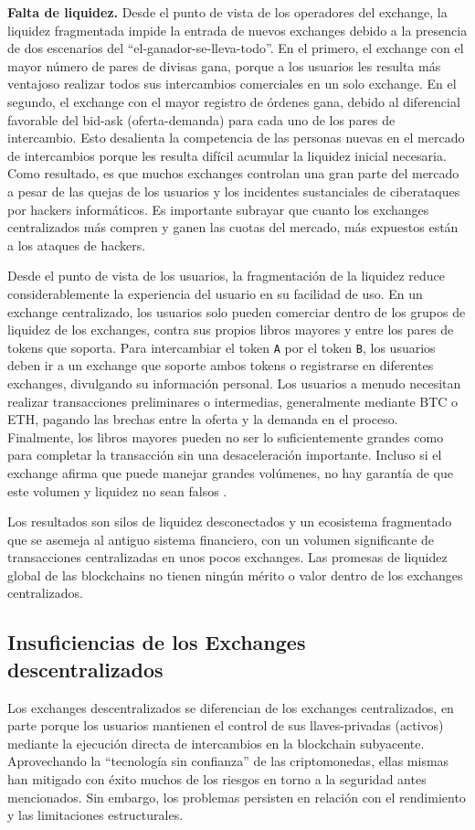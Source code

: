 \documentclass[UTF8,nofonts]{article}
\begin{document}
\begin{multicols}{2}
\textbf{Falta de liquidez.} Desde el punto de vista de los operadores del exchange, la liquidez fragmentada impide la entrada de nuevos exchanges debido a la presencia de dos escenarios del \enquote{el-ganador-se-lleva-todo}. En el primero, el exchange con el mayor n\'umero de pares de divisas gana, porque a los usuarios les resulta m\'as ventajoso realizar todos sus intercambios comerciales en un solo exchange. En el segundo, el exchange con el mayor registro de \'ordenes gana, debido al diferencial favorable del bid-ask (oferta-demanda) para cada uno de los pares de intercambio. Esto desalienta la competencia de las personas nuevas en el mercado de intercambios porque les resulta dif\'icil acumular la liquidez inicial necesaria. Como resultado, es que muchos exchanges controlan una gran parte del mercado a pesar de las quejas de los usuarios y los incidentes sustanciales de ciberataques por hackers inform\'aticos. Es importante subrayar que cuanto los exchanges centralizados m\'as compren y ganen las cuotas del mercado, m\'as expuestos est\'an a los ataques de hackers.

Desde el punto de vista de los usuarios, la fragmentaci\'on de la liquidez reduce considerablemente la experiencia del usuario en su facilidad de uso. En un exchange centralizado, los usuarios solo pueden comerciar dentro de los grupos de liquidez de los exchanges, contra sus propios libros mayores y entre los pares de tokens que soporta. Para intercambiar el token \verb|A| por el token \verb|B|, los usuarios deben ir a un exchange que soporte ambos tokens o registrarse en diferentes exchanges, divulgando su informaci\'on personal. Los usuarios a menudo necesitan realizar transacciones preliminares o intermedias, generalmente mediante BTC o ETH, pagando las brechas entre la oferta y la demanda en el proceso. Finalmente, los libros mayores pueden no ser lo suficientemente grandes como para completar la transacci\'on sin una desaceleraci\'on importante. Incluso si el exchange afirma que puede manejar grandes vol\'umenes, no hay garant\'ia de que este volumen y liquidez no sean falsos \cite{fakevolume}.

Los resultados son silos de liquidez desconectados y un ecosistema fragmentado que se asemeja al antiguo sistema financiero, con un volumen significante de transacciones centralizadas en unos pocos exchanges. Las promesas de liquidez global de las blockchains no tienen ning\'un m\'erito o valor dentro de los exchanges centralizados.

\subsection{Insuficiencias de los Exchanges descentralizados}
Los exchanges descentralizados se diferencian de los exchanges centralizados, en parte porque los usuarios mantienen el control de sus llaves-privadas (activos) mediante la ejecuci\'on directa de intercambios en la blockchain subyacente. Aprovechando la \enquote{tecnolog\'ia sin confianza} de las criptomonedas, ellas mismas han mitigado con \'exito muchos de los riesgos en torno a la seguridad antes mencionados. Sin embargo, los problemas persisten en relaci\'on con el rendimiento y las limitaciones estructurales.


\end{multicols}
\end{document}
